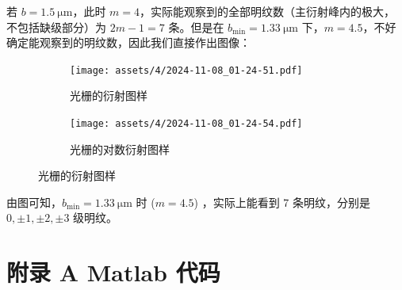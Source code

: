 \documentclass[UTF8]{report}
\theoremstyle{MyLineTheoremStyle} %
\theoremstyle{MyBlockTheoremStyle} %
\theoremstyle{MySubsubsectionStyle} %
\begin{document}
若 $b = 1.5  \ \mathrm{\mu m}$，此时 $m = 4$，实际能观察到的全部明纹数（主衍射峰内的极大，不包括缺级部分）为 $2m - 1 = 7$ 条。但是在 $b_{\min} = 1.33  \ \mathrm{\mu m}$ 下，$m = 4.5$，不好确定能观察到的明纹数，因此我们直接作出图像：
\begin{figure}[H]\centering
\begin{subfigure}[b]{0.5\columnwidth}\centering
    \texttt{[image: assets/4/2024-11-08\_01-24-51.pdf]}
    \caption{光栅的衍射图样}
\end{subfigure}\hfill
\begin{subfigure}[b]{0.5\columnwidth}\centering
    \texttt{[image: assets/4/2024-11-08\_01-24-54.pdf]}
    \caption{光栅的对数衍射图样}
\end{subfigure}\vspace*{-5mm}
\caption{光栅的衍射图样}
\end{figure}
由图可知，$b_{\min} = 1.33  \ \mathrm{\mu m}$ 时 ($m = 4.5$) ，实际上能看到 7 条明纹，分别是 $0, \pm 1, \pm 2, \pm 3$ 级明纹。


\newpage
\appendix
\titleformat{\chapter}[hang]{\normalfont\huge\bfseries\centering}{}{20pt}{}
\titlespacing*{\chapter}{0pt}{-25pt}{8pt} %
\titleformat{\section}[hang]{\normalfont\centering\Large\bfseries}{\thesection}{8pt}{}

\chapter*{附录 A\hspace*{20pt}  Matlab 代码}\setcounter{chapter}{1} 
\setcounter{equation}{0}    %
\thispagestyle{fancy} 
\setcounter{section}{0}   
\renewcommand\thesection{A.\arabic{section}}   
\renewcommand{\thefigure}{A.\arabic{figure}} 
\renewcommand{\thetable}{A.\arabic{table}}
\end{document}
